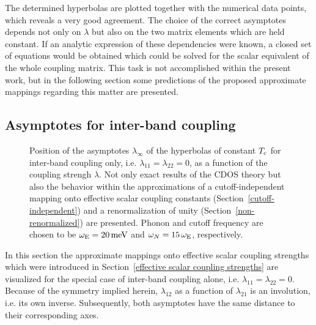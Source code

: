 The determined hyperbolas are plotted together with the numerical data points,
which reveals a very good agreement. The choice of the correct asymptotes
depends not only on $\lambda$ but also on the two matrix elements which are held
constant. If an analytic expression of these dependencies were known, a closed
set of equations would be obtained which could be solved for the scalar
equivalent of the whole coupling matrix. This task is not accomplished within
the present work, but in the following section some predictions of the proposed
approximate mappings regarding this matter are presented.

\subsection{Asymptotes for inter-band coupling}

\begin{figure}
    \small
    
    
    \caption[Asymptotes for inter-band coupling]{
        Position of the asymptotes $\lambda_\infty$ of the hyperbolas of
        constant $T \sb{\text{c}}$ for inter-band coupling only, i.e. $\lambda_{1 1} =
        \lambda_{2 2} = 0$, as a function of the coupling strengh $\lambda$. Not
        only exact results of the CDOS  theory but also the
        behavior within the approximations of a cutoff-independent mapping onto
        effective scalar coupling constants (Section~\ref{cutoff-independent})
        and a renormalization of unity (Section~\ref{non-renormalized}) are
        presented. Phonon and cutoff frequency are chosen to be $\omega \sb{\text{E}} =
        20 \, \mathrm{meV}$ and $\omega_N = 15 \, \omega \sb{\text{E}}$, respectively.}
    \label{inter-band hyperbola of constant Tc}
\end{figure}
%
In this section the approximate mappings onto effective scalar coupling
strengths which were introduced in Section~\ref{effective scalar coupling
strengths} are visualized for the special case of inter-band coupling alone,
i.e. $\lambda_{1 1} = \lambda_{2 2} = 0$. Because of the symmetry implied
herein, $\lambda_{1 2}$ as a function of $\lambda_{2 1}$ is an involution, i.e.
its own inverse. Subsequently, both asymptotes have the same distance to their
corresponding axes.

